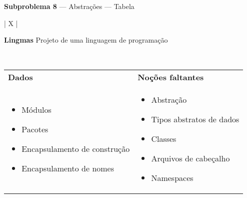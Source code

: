 \documentclass[12pt, a4paper]{article}
\begin{document}
\begin{center}
\large \textbf{Subproblema 8} --- Abstrações --- Tabela
\end{center}

\bigskip

\begin{longtabu}{| X |}
    \hline
    \begin{center}
        \large \textbf{Lingmas} \linebreak
        Projeto de uma linguagem de programação
    \end{center}
    \\ \hline

    \begin{tabu}{ X | X }
        \textbf{Dados} &
        \textbf{Noções faltantes}
        \\
        \begin{minipage}[t]{\linewidth}
        \begin{itemize}[itemsep=.5ex,parsep=.0ex,after=\strut,leftmargin=15pt]
            \item Módulos
            \item Pacotes
            \item Encapsulamento de construção
            \item Encapsulamento de nomes
        \end{itemize}
        \end{minipage}
        &
        \begin{minipage}[t]{\linewidth}
        \begin{itemize}[itemsep=.5ex,parsep=.0ex,after=\strut,leftmargin=15pt]
            \item Abstração
            \item Tipos abstratos de dados
            \item Classes
            \item Arquivos de cabeçalho
            \item Namespaces
        \end{itemize}
        \end{minipage}
    \end{tabu}
    \\ \hline


\end{longtabu}
\end{document}
